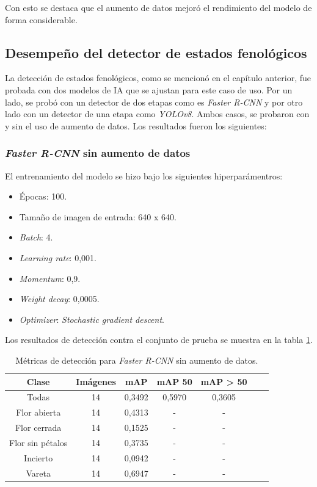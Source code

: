 Con esto se destaca que el aumento de datos mejoró el rendimiento del modelo de forma considerable.

\subsection{Desempeño del detector de estados fenológicos}

La detección de estados fenológicos, como se mencionó en el capítulo anterior, fue probada con dos modelos de IA que se ajustan para este caso de uso. Por un lado, se probó con un detector de dos etapas como es \textit{Faster R-CNN} y por otro lado con un detector de una etapa como \textit{YOLOv8}. Ambos casos, se probaron con y sin el uso de aumento de datos. Los resultados fueron los siguientes:

\subsubsection{\textit{Faster R-CNN} sin aumento de datos}

El entrenamiento del modelo se hizo bajo los siguientes hiperparámentros:

\begin{itemize}
	\item Épocas: 100.
    \item Tamaño de imagen de entrada: 640 x 640.
    \item \textit{Batch}: 4.
    \item \textit{Learning rate}: 0,001.
    \item \textit{Momentum}: 0,9.
    \item \textit{Weight decay}: 0,0005.
    \item \textit{Optimizer}: \textit{Stochastic gradient descent}.
\end{itemize}

Los resultados de detección contra el conjunto de prueba se muestra en la tabla \ref{tab:resultadosFasterSinAug}.

\begin{table}[h]
	\centering
	\caption{Métricas de detección para \textit{Faster R-CNN} sin aumento de datos.}
	\begin{tabular}{c c c c c c c}    
		\toprule
		\textbf{Clase}&\textbf{Imágenes}&\textbf{mAP}&\textbf{mAP 50}&\textbf{mAP > 50}\\
		\midrule
		Todas & 14 & 0,3492 & 0,5970 & 0,3605\\
		Flor abierta & 14 & 0,4313 & - & - \\
		Flor cerrada & 14 & 0,1525 & - & - \\
		Flor sin pétalos & 14 & 0,3735 & - & - \\
		Incierto & 14 & 0,0942 & - & - \\
		Vareta & 14 & 0,6947 & - & - \\		
		\bottomrule
		\hline
	\end{tabular}
	\label{tab:resultadosFasterSinAug}
\end{table}

